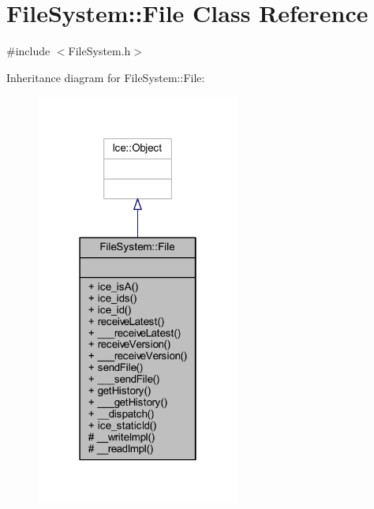 \hypertarget{class_file_system_1_1_file}{}\section{File\+System\+:\+:File Class Reference}
\label{class_file_system_1_1_file}


{\ttfamily \#include $<$File\+System.\+h$>$}



Inheritance diagram for File\+System\+:\+:File\+:
\nopagebreak
\begin{figure}[H]
\begin{center}
\leavevmode
\includegraphics[width=190pt]{class_file_system_1_1_file__inherit__graph}
\end{center}
\end{figure}


